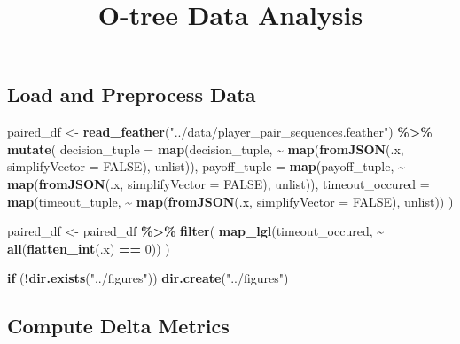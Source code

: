 \documentclass[
]{article}
\title{O-tree Data Analysis}
\author{}
\date{\vspace{-2.5em}}
\newenvironment{Shaded}{\begin{snugshade}}{\end{snugshade}}
\newcommand{\AttributeTok}[1]{\textcolor[rgb]{0.13,0.29,0.53}{#1}}
\newcommand{\ConstantTok}[1]{\textcolor[rgb]{0.56,0.35,0.01}{#1}}
\newcommand{\ControlFlowTok}[1]{\textcolor[rgb]{0.13,0.29,0.53}{\textbf{#1}}}
\newcommand{\DecValTok}[1]{\textcolor[rgb]{0.00,0.00,0.81}{#1}}
\newcommand{\FunctionTok}[1]{\textcolor[rgb]{0.13,0.29,0.53}{\textbf{#1}}}
\newcommand{\NormalTok}[1]{#1}
\newcommand{\OtherTok}[1]{\textcolor[rgb]{0.56,0.35,0.01}{#1}}
\newcommand{\SpecialCharTok}[1]{\textcolor[rgb]{0.81,0.36,0.00}{\textbf{#1}}}
\newcommand{\StringTok}[1]{\textcolor[rgb]{0.31,0.60,0.02}{#1}}
\begin{document}
\maketitle

\subsection{Load and Preprocess Data}\label{load-and-preprocess-data}

\begin{Shaded}
\begin{Highlighting}[]
\NormalTok{paired\_df }\OtherTok{\textless{}{-}} \FunctionTok{read\_feather}\NormalTok{(}\StringTok{"../data/player\_pair\_sequences.feather"}\NormalTok{) }\SpecialCharTok{\%\textgreater{}\%}
  \FunctionTok{mutate}\NormalTok{(}
    \AttributeTok{decision\_tuple =} \FunctionTok{map}\NormalTok{(decision\_tuple, }\SpecialCharTok{\textasciitilde{}} \FunctionTok{map}\NormalTok{(}\FunctionTok{fromJSON}\NormalTok{(.x, }\AttributeTok{simplifyVector =} \ConstantTok{FALSE}\NormalTok{), unlist)),}
    \AttributeTok{payoff\_tuple   =} \FunctionTok{map}\NormalTok{(payoff\_tuple,   }\SpecialCharTok{\textasciitilde{}} \FunctionTok{map}\NormalTok{(}\FunctionTok{fromJSON}\NormalTok{(.x, }\AttributeTok{simplifyVector =} \ConstantTok{FALSE}\NormalTok{), unlist)),}
    \AttributeTok{timeout\_occured =} \FunctionTok{map}\NormalTok{(timeout\_tuple, }\SpecialCharTok{\textasciitilde{}} \FunctionTok{map}\NormalTok{(}\FunctionTok{fromJSON}\NormalTok{(.x, }\AttributeTok{simplifyVector =} \ConstantTok{FALSE}\NormalTok{), unlist))}
\NormalTok{  )}

\NormalTok{paired\_df }\OtherTok{\textless{}{-}}\NormalTok{ paired\_df }\SpecialCharTok{\%\textgreater{}\%}
  \FunctionTok{filter}\NormalTok{(}
    \FunctionTok{map\_lgl}\NormalTok{(timeout\_occured, }\SpecialCharTok{\textasciitilde{}} \FunctionTok{all}\NormalTok{(}\FunctionTok{flatten\_int}\NormalTok{(.x) }\SpecialCharTok{==} \DecValTok{0}\NormalTok{))}
\NormalTok{  )}

\ControlFlowTok{if}\NormalTok{ (}\SpecialCharTok{!}\FunctionTok{dir.exists}\NormalTok{(}\StringTok{"../figures"}\NormalTok{)) }\FunctionTok{dir.create}\NormalTok{(}\StringTok{"../figures"}\NormalTok{)}
\end{Highlighting}
\end{Shaded}

\subsection{Compute Delta Metrics}\label{compute-delta-metrics}
\end{document}
